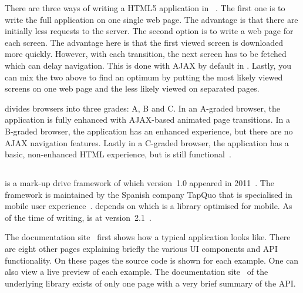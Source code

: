 \documentclass[a4paper]{artikel3}
\newcommand{\term}[1]{\emph{#1}}
\newcommand{\setspace}[0]{\vspace{2mm}}
\renewcommand{\paragraph}[1]{\setspace \noindent {\bf #1}  }
\begin{document}
There are three ways of writing a HTML5 application in \jqma{}~\cite{Broulik2012}. 
The first one is to write the full application on one single web page.
The advantage is that there are initially less requests to the server.
The second option is to write a web page for each screen. 
The advantage here is that the first viewed screen is downloaded more quickly. 
However, with each transition, the next screen has to be fetched which can delay navigation.
This is done with AJAX by default in \jqma{}.
Lastly, you can mix the two above to find an optimum by putting the most likely viewed screens on one web page and the less likely viewed on separated pages.  

\paragraph{Browser support}
\label{sec:jqm-browser-support}
\jqma{} divides browsers into three grades: A, B and C. 
In an A-graded browser, the application is fully enhanced with AJAX-based animated page transitions.
In a B-graded browser, the application has an enhanced experience, but there are no AJAX navigation features.
Lastly in a C-graded browser, the application has a basic, non-enhanced HTML experience, but is still functional~\cite{JQuery2012d}.


\subsection{\lungo} %
\label{sec:frameworks-lungo}

\lungo{} is a mark-up drive framework of which version~1.0 appeared in 2011~\cite{TapQuo2011}.
The framework is maintained by the Spanish company TapQuo that is specialised in mobile user experience~\cite{TapQuo2013a}.
\lungo{} depends on  \quo{} which is a \js{} library optimised for mobile.
As of the time of writing, \lungo{} is at version~2.1~\cite{TapQuo2013}.

\paragraph{Documentation}
The documentation site~\cite{Lungo2013} first shows how a typical \lungo{} application looks like.
There are eight other pages explaining briefly the various UI components and API functionality.
On these pages the source code is shown for each example.
One can also view a live preview of each example.
The documentation site~\cite{TapQuo2013c} of the underlying \js{} library exists of only one page with a very brief summary of the API.
\end{document}
